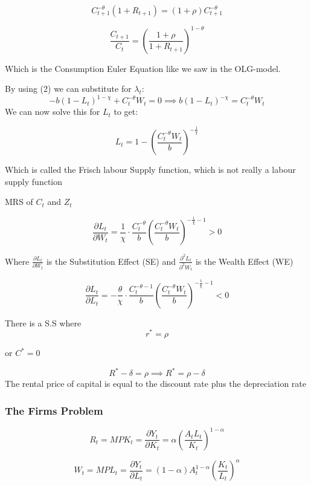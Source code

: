 $$
C_{t+1}^{-\theta} (1 + R_{t+1}) = (1 + \rho)C_{t+1}^{-\theta}
$$


\begin{equation*}
    \frac {  C_{t+1}  } { C_t }  = \left( \frac { 1 + \rho } { 1 + R _ { t + 1 } } \right) ^ { 1 - \theta }
\end{equation*}

Which is the Consumption Euler Equation like we saw in the OLG-model. 

By using (2) we can substitute for $\lambda_t$:
$$
-b (1- L_t)^{1 - \chi} + C_{t}^{-\theta} W_t = 0 \implies b(1 - L_t)^{- \chi } = C_t^{-\theta} W_{t}
$$
We can now solve this for $L_t$ to get:

\begin{equation}\label{frisch_labour_supply}
    L_t = 1 - \left( \frac{C_t^{-\theta}W_t}{b} \right) ^{-\frac{1}{\chi}}
\end{equation}

Which is called the Frisch labour Supply function, which is not really a labour supply function

MRS of $C_t$ and $Z_t$

$$
\frac{\partial L_t}{\partial W_t} = \frac{1}{\chi} \cdot \frac{C_t^{- \theta}}{b} \left( \frac{C_t^{- \theta} W_t}{b} \right) ^ {- \frac{1}{\chi} -1 } > 0
$$

Where $\tfrac{\partial L_t}{\partial W_t}$ is the Substitution Effect (SE) and $\tfrac{\partial^2 L_t}{\partial^2 W_t}$ is the Wealth Effect (WE)

$$
\frac{\partial L_t}{\partial L_t} = - \frac{\theta}{\chi} \cdot \frac{C_t^{- \theta - 1}}{b} \left( \frac{C_t^{- \theta} W_t}{b} \right) ^ {- \frac{1}{\chi} -1 } < 0
$$

There is a S.S where
$$
r^* = \rho 
$$

or $C^* = 0$

$$
R^* - \delta = \rho \implies R^* = \rho - \delta
$$
The rental price of capital is equal to the discount rate plus the depreciation rate

\subsubsection{The Firms Problem}

$$
R_t = MPK_t = \frac{\partial Y_t}{\partial K_t} = \alpha \left( \frac{A_t L_t}{K_t} \right)^{1-\alpha}
$$

$$
W_t = MPL_t = \frac{\partial Y_t}{\partial L_t} = (1 - \alpha ) A_t^{1-\alpha} \left( \frac{K_t}{L_t} \right)^{\alpha} 
$$

